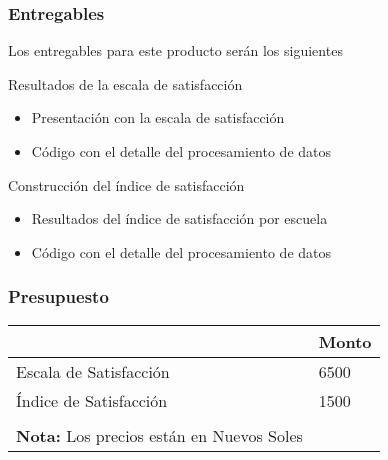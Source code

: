 \documentclass{beamer}
\begin{document}
\begin{frame}
\frametitle{Entregables}

Los entregables para este producto serán los siguientes 


\begin{block}{Resultados de la escala de satisfacción}
\begin{itemize}
\item Presentación con la escala de satisfacción
\item Código con el detalle del procesamiento de datos
\end{itemize}
\end{block}

\begin{block}{Construcción del índice de satisfacción}
\begin{itemize}
\item Resultados del índice de satisfacción por escuela
\item Código con el detalle del procesamiento de datos
\end{itemize}
\end{block}
\end{frame}

\begin{frame}
\frametitle{Presupuesto}
\begin{table}[ht]
\begin{tabular}{ll}
\hline
                       & Monto \\ \hline
Escala de Satisfacción & 6500  \\ 
Índice de Satisfacción & 1500  \\ \hline 
\\

\textbf{Nota:} Los precios están en \alert{Nuevos Soles}
\end{tabular}
\end{table}





\end{frame}
\end{document}
